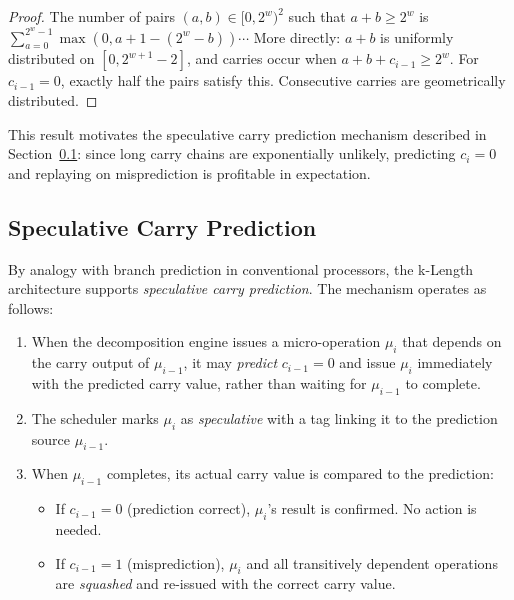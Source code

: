 \documentclass[11pt,a4paper]{article}
\begin{document}
\begin{proof}
The number of pairs $(a, b) \in [0, 2^w)^2$ such that $a + b \ge 2^w$ is
$\sum_{a=0}^{2^w-1} \max(0, a + 1 - (2^w - b)) \cdots$  More directly: $a + b$
is uniformly distributed on $[0, 2^{w+1} - 2]$, and carries occur when
$a + b + c_{i-1} \ge 2^w$.  For $c_{i-1} = 0$, exactly half the pairs
satisfy this.  Consecutive carries are geometrically distributed.
\end{proof}

This result motivates the speculative carry prediction mechanism described
in Section~\ref{sec:carry-prediction}: since long carry chains are
exponentially unlikely, predicting $c_i = 0$ and replaying on misprediction
is profitable in expectation.

\subsection{Speculative Carry Prediction}
\label{sec:carry-prediction}

By analogy with branch prediction in conventional processors, the k-Length
architecture supports \emph{speculative carry prediction}.  The mechanism
operates as follows:

\begin{enumerate}[leftmargin=*]
  \item When the decomposition engine issues a micro-operation $\mu_i$ that
    depends on the carry output of $\mu_{i-1}$, it may \emph{predict}
    $c_{i-1} = 0$ and issue $\mu_i$ immediately with the predicted carry
    value, rather than waiting for $\mu_{i-1}$ to complete.

  \item The scheduler marks $\mu_i$ as \emph{speculative} with a tag
    linking it to the prediction source $\mu_{i-1}$.

  \item When $\mu_{i-1}$ completes, its actual carry value is compared to
    the prediction:
    \begin{itemize}
      \item If $c_{i-1} = 0$ (prediction correct), $\mu_i$'s result is
        confirmed.  No action is needed.
      \item If $c_{i-1} = 1$ (misprediction), $\mu_i$ and all transitively
        dependent operations are \emph{squashed} and re-issued with the
        correct carry value.
    \end{itemize}
\end{enumerate}
\end{document}
